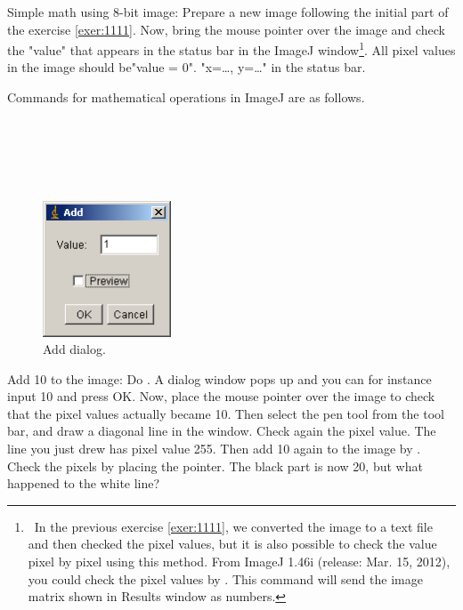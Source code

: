 \begin{indentexercise}{1}
Simple math using 8-bit image: Prepare a new
image following the initial part of the exercise \ref{exer:1111}. Now,
bring the mouse pointer over the image and check the
"value" that appears in the
status bar in the ImageJ window\footnote{\ In the previous exercise \ref{exer:1111}, 
we converted the image to a text file and then checked the pixel
values, but it is also possible to check the value pixel by pixel using
this method. From ImageJ 1.46i (release: Mar. 15, 2012), 
you could check the pixel values by . 
This command will send the image matrix shown in Results window as numbers.}. 
All pixel values in the image should be"value = 0".
"x=\ldots, y=\ldots " in the
status bar. 

Commands for mathematical operations in ImageJ are as follows. 

\\
\\ 
 \\
\\

\begin{figure}[htbp]
\begin{center}
\includegraphics[width=3.8cm]{fig/CMCIBasicCourse201102-img12.png}
\caption{ Add dialog.}
\label{fig:img12}
\end{center}
\end{figure}


Add 10 to the image: Do . A dialog window pops up and you can for instance 
input 10 and press OK. Now, place the mouse pointer over the image
to check that the pixel values actually became 10. Then select the pen
tool from the tool bar, and draw a diagonal line in the window. Check
again the pixel value. The line you just drew has pixel value 255. Then
add 10 again to the image by . Check the pixels by placing the pointer.
The black part is now 20, but what happened to the white line? 


\end{indentexercise}
